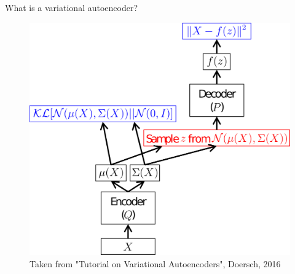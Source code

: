 \documentclass[10pt,aspectratio=169,handout]{beamer}
\begin{document}
\begin{frame}{What is a variational autoencoder?}
	\begin{center}
            \begin{figure}
                \includegraphics[height=.8\textheight]{figs/net.png}
                \caption{Taken from "Tutorial on Variational Autoencoders", Doersch, 2016}
            \end{figure}
	\end{center}
\end{frame}
\end{document}

